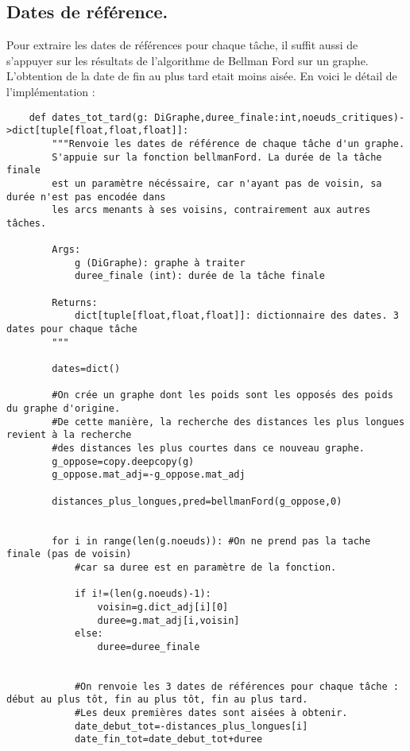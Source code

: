 \documentclass{article}
\begin{document}
\subsection{Dates de référence.}

Pour extraire les dates de références pour chaque tâche, il suffit aussi de s'appuyer sur les résultats
de l'algorithme de Bellman Ford sur un graphe. L'obtention de la date de fin au plus tard etait moins aisée.
En voici le détail de l'implémentation :


\begin{verbatim}
    def dates_tot_tard(g: DiGraphe,duree_finale:int,noeuds_critiques)->dict[tuple[float,float,float]]:
        """Renvoie les dates de référence de chaque tâche d'un graphe.
        S'appuie sur la fonction bellmanFord. La durée de la tâche finale
        est un paramètre nécéssaire, car n'ayant pas de voisin, sa durée n'est pas encodée dans 
        les arcs menants à ses voisins, contrairement aux autres tâches.

        Args:
            g (DiGraphe): graphe à traiter
            duree_finale (int): durée de la tâche finale

        Returns:
            dict[tuple[float,float,float]]: dictionnaire des dates. 3 dates pour chaque tâche
        """

        dates=dict()
        
        #On crée un graphe dont les poids sont les opposés des poids du graphe d'origine.
        #De cette manière, la recherche des distances les plus longues revient à la recherche
        #des distances les plus courtes dans ce nouveau graphe.
        g_oppose=copy.deepcopy(g)
        g_oppose.mat_adj=-g_oppose.mat_adj
        
        distances_plus_longues,pred=bellmanFord(g_oppose,0)
        

        for i in range(len(g.noeuds)): #On ne prend pas la tache finale (pas de voisin)
            #car sa duree est en paramètre de la fonction.
            
            if i!=(len(g.noeuds)-1): 
                voisin=g.dict_adj[i][0]  
                duree=g.mat_adj[i,voisin]
            else:
                duree=duree_finale
                

            #On renvoie les 3 dates de références pour chaque tâche : début au plus tôt, fin au plus tôt, fin au plus tard.
            #Les deux premières dates sont aisées à obtenir.
            date_debut_tot=-distances_plus_longues[i]
            date_fin_tot=date_debut_tot+duree
            

\end{verbatim}
\end{document}
